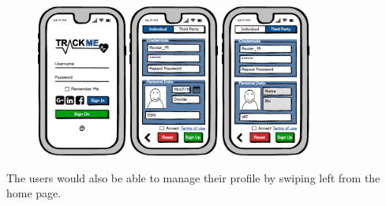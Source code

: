 \documentclass[a4paper]{article}
\begin{document}
        \begin{figure}[!htpb]
    	\centering
    	\includegraphics[height=50mm]{images/mockups/Login_Registration.png}
    	\includegraphics[height=50mm]{images/mockups/RegistrationForm.png}
    	\includegraphics[height=50mm]{images/mockups/ThirdPartyRegistration.png}
        \end{figure}
        
        The users would also be able to manage their profile by swiping left from the home page.
        
\end{document}
